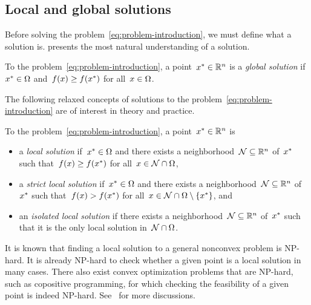 \subsection{Local and global solutions}

Before solving the problem~\cref{eq:problem-introduction}, we must define what a solution is.
 presents the most natural understanding of a solution.

\begin{definition}
    \label{def:global-solution}
    To the problem~\cref{eq:problem-introduction}, a point~$\iter[\ast] \in \R^n$ is a \emph{global solution} if~$\iter[\ast] \in \fset$ and~$\obj(\iter) \ge \obj(\iter[\ast])$ for all~$\iter \in \fset$.
\end{definition}

The following relaxed concepts of solutions to the problem~\cref{eq:problem-introduction} are of interest in theory and practice.

\begin{definition}
    To the problem~\cref{eq:problem-introduction}, a point~$\iter[\ast] \in \R^n$ is
    \begin{itemize}
        \item a \emph{local solution} if~$\iter[\ast] \in \fset$ and there exists a neighborhood~$\mathcal{N} \subseteq \mathbb{R}^n$ of~$\iter[\ast]$ such that~$\obj(\iter) \ge \obj(\iter[\ast])$ for all~$\iter \in \mathcal{N} \cap \fset$,
        \item a \emph{strict local solution} if~$\iter[\ast] \in \fset$ and there exists a neighborhood~$\mathcal{N} \subseteq \mathbb{R}^n$ of~$\iter[\ast]$ such that~$\obj(\iter) > \obj(\iter[\ast])$ for all~$\iter \in \mathcal{N} \cap \fset \setminus \set{\iter[\ast]}$, and
        \item an \emph{isolated local solution} if there exists a neighborhood~$\mathcal{N} \subseteq \mathbb{R}^n$ of~$\iter[\ast]$ such that it is the only local solution in~$\mathcal{N} \cap \Omega$.
    \end{itemize}
\end{definition}

It is known that finding a local solution to a general nonconvex problem is NP-hard.
It is already NP-hard to check whether a given point is a local solution in many cases.
There also exist convex optimization problems that are NP-hard, such as copositive programming, for which checking the feasibility of a given point is indeed NP-hard.
See~\cite{Murty_Kabadi_1987} for more discussions.

